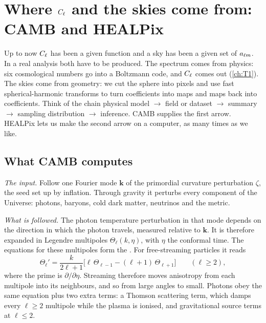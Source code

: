 \section{Where $C_\ell$ and the skies come from: CAMB and HEALPix}
\label{7b:sec:camb-healpix}

Up to now $C_\ell$ has been a given function and a sky has been a given set of $a_{\ell m}$. In a real
analysis both have to be produced. The spectrum comes from physics: six cosmological numbers go
into a Boltzmann code, and $C_\ell$ comes out (\cref{ch:T1}). The skies come from geometry: we
cut the sphere into pixels and use fast spherical-harmonic transforms to turn coefficients into
maps and maps back into coefficients. Think of the chain physical model $\to$ field or
dataset $\to$ summary $\to$ sampling distribution $\to$ inference. CAMB supplies the first arrow.
HEALPix lets us make the second arrow on a computer, as many times as we like.

\subsection{What CAMB computes}
\label{7b:sec:camb}

\emph{The input.} Follow one Fourier mode $\bm k$ of the primordial curvature perturbation
$\zeta$, the seed set up by inflation. Through gravity it perturbs
every component of the Universe: photons, baryons, cold dark matter, neutrinos and the metric.

\emph{What is followed.} The photon temperature perturbation in that mode depends on the
direction in which the photon travels, measured relative to $\bm k$. It is therefore expanded in
Legendre multipoles $\Theta_\ell(k,\eta)$, with $\eta$ the conformal time. The equations for these
multipoles form the . For free-streaming particles it reads
\begin{equation}
  \Theta_\ell'=\frac{k}{2\ell+1}\bigl[\ell\,\Theta_{\ell-1}-(\ell+1)\,\Theta_{\ell+1}\bigr]
  \qquad(\ell\ge2),
  \label{7b:eq:hierarchy}
\end{equation}
where the prime is $\partial/\partial\eta$. Streaming therefore moves anisotropy from each
multipole into its neighbours, and so from large angles to small. Photons obey the same equation
plus two extra terms: a Thomson scattering term, which damps every $\ell\ge2$ multipole while the
plasma is ionised, and gravitational source terms at $\ell\le2$.


